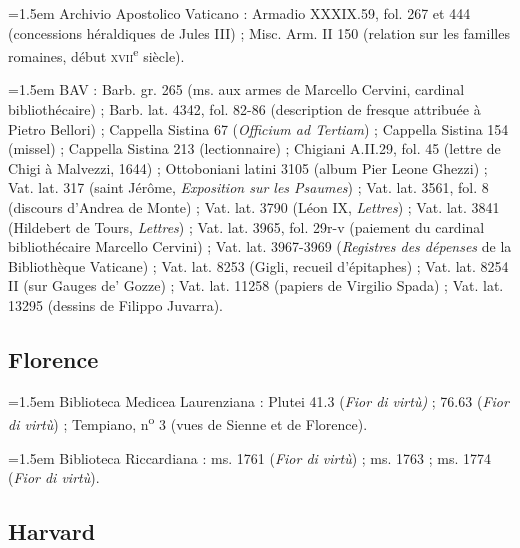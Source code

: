 \documentclass[12pt,twoside,openany]{book}
\newenvironment{PurhBibliography}
  {%
    \par
    \setlength{\parindent}{0pt}%
    \setlength{\leftskip}{0pt}%
  }
  {%
    \par
  }
\begin{document}
\begin{PurhBibliography}
\noindent\hangindent=1.5em Archivio Apostolico Vaticano : Armadio \textsc{XXXIX}.59, fol. 267 et 444 (concessions héraldiques de Jules \textsc{III}) ; Misc. Arm. \textsc{II} 150 (relation sur les familles romaines, début \textsc{xvii}\textsuperscript{e} siècle).\par
\noindent\hangindent=1.5em BAV : Barb. gr. 265 (ms. aux armes de Marcello Cervini, cardinal bibliothécaire) ; Barb. lat. 4342, fol. 82-86 (description de fresque attribuée à Pietro Bellori) ; Cappella Sistina 67 (\textit{Officium ad Tertiam}) ; Cappella Sistina 154 (missel) ; Cappella Sistina 213 (lectionnaire) ; Chigiani A.\textsc{II}.29, fol. 45 (lettre de Chigi à Malvezzi, 1644) ; Ottoboniani latini 3105 (album Pier Leone Ghezzi) ; Vat. lat. 317 (saint Jérôme, \textit{Exposition sur les Psaumes}) ; Vat. lat. 3561, fol. 8 (discours d’Andrea de Monte) ; Vat. lat. 3790 (Léon \textsc{IX}, \textit{Lettres}) ; Vat. lat. 3841 (Hildebert de Tours, \textit{Lettres}) ; Vat. lat. 3965, fol. 29r-v (paiement du cardinal bibliothécaire Marcello Cervini) ; Vat. lat. 3967-3969 (\textit{Registres des dépenses} de la Bibliothèque Vaticane) ; Vat. lat. 8253 (Gigli, recueil d’épitaphes) ; Vat. lat. 8254 \textsc{II} (sur Gauges de’ Gozze) ; Vat. lat. 11258 (papiers de Virgilio Spada) ; Vat. lat. 13295 (dessins de Filippo Juvarra).\par
\end{PurhBibliography}

\subsection{Florence}

\begin{PurhBibliography}
\noindent\hangindent=1.5em Biblioteca Medicea Laurenziana : Plutei 41.3 (\textit{Fior di virtù) }; 76.63 (\textit{Fior di virtù}) ; Tempiano, n\textsuperscript{o} 3 (vues de Sienne et de Florence).\par
\noindent\hangindent=1.5em Biblioteca Riccardiana : ms. 1761 (\textit{Fior di virtù}) ; ms. 1763 ; ms. 1774 (\textit{Fior di virtù}).\par
\end{PurhBibliography}

\subsection{Harvard}
\end{document}

